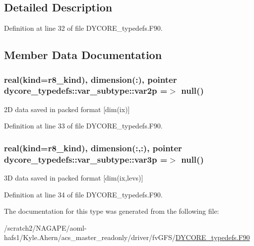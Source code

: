 \subsection{Detailed Description}


Definition at line 32 of file D\-Y\-C\-O\-R\-E\-\_\-typedefs.\-F90.



\subsection{Member Data Documentation}
\subsubsection[{var2p}]{\setlength{\rightskip}{0pt plus 5cm}real(kind=r8\-\_\-kind), dimension(\-:), pointer dycore\-\_\-typedefs\-::var\-\_\-subtype\-::var2p =$>$ null()}\label{structdycore__typedefs_1_1var__subtype_ae7f1321cbe3f9c0f1cf24af0e39bb2c6}


2\-D data saved in packed format \mbox{[}dim(ix)\mbox{]} 



Definition at line 33 of file D\-Y\-C\-O\-R\-E\-\_\-typedefs.\-F90.

\subsubsection[{var3p}]{\setlength{\rightskip}{0pt plus 5cm}real(kind=r8\-\_\-kind), dimension(\-:,\-:), pointer dycore\-\_\-typedefs\-::var\-\_\-subtype\-::var3p =$>$ null()}\label{structdycore__typedefs_1_1var__subtype_af3e57f945956db4f682481b4aeb5d11f}


3\-D data saved in packed format \mbox{[}dim(ix,levs)\mbox{]} 



Definition at line 34 of file D\-Y\-C\-O\-R\-E\-\_\-typedefs.\-F90.



The documentation for this type was generated from the following file\-:\begin{DoxyCompactItemize}
\item 
/scratch2/\-N\-A\-G\-A\-P\-E/aoml-\/hafs1/\-Kyle.\-Ahern/acs\-\_\-master\-\_\-readonly/driver/fv\-G\-F\-S/\hyperlink{DYCORE__typedefs_8F90}{D\-Y\-C\-O\-R\-E\-\_\-typedefs.\-F90}\end{DoxyCompactItemize}
